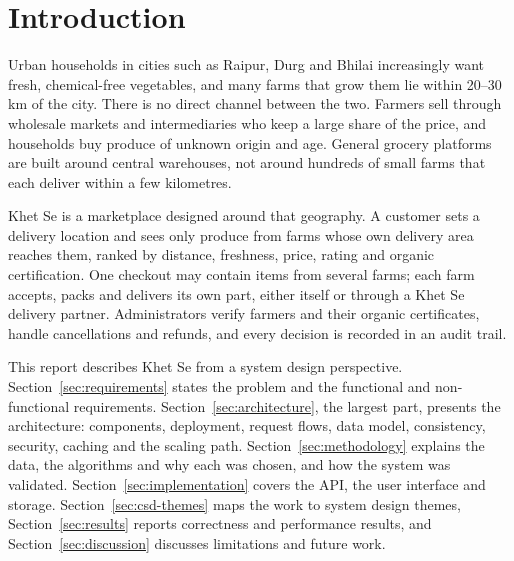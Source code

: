 \documentclass[manuscript,screen,review]{acmart}
\begin{document}

\maketitle

\section{Introduction}
\label{sec:intro}

Urban households in cities such as Raipur, Durg and Bhilai increasingly want fresh, chemical-free vegetables, and many farms that grow them lie within 20--30\,km of the city. There is no direct channel between the two. Farmers sell through wholesale markets and intermediaries who keep a large share of the price, and households buy produce of unknown origin and age. General grocery platforms are built around central warehouses, not around hundreds of small farms that each deliver within a few kilometres.

Khet Se is a marketplace designed around that geography. A customer sets a delivery location and sees only produce from farms whose own delivery area reaches them, ranked by distance, freshness, price, rating and organic certification. One checkout may contain items from several farms; each farm accepts, packs and delivers its own part, either itself or through a Khet Se delivery partner. Administrators verify farmers and their organic certificates, handle cancellations and refunds, and every decision is recorded in an audit trail.

This report describes Khet Se from a system design perspective. Section~\ref{sec:requirements} states the problem and the functional and non-functional requirements. Section~\ref{sec:architecture}, the largest part, presents the architecture: components, deployment, request flows, data model, consistency, security, caching and the scaling path. Section~\ref{sec:methodology} explains the data, the algorithms and why each was chosen, and how the system was validated. Section~\ref{sec:implementation} covers the API, the user interface and storage. Section~\ref{sec:csd-themes} maps the work to system design themes, Section~\ref{sec:results} reports correctness and performance results, and Section~\ref{sec:discussion} discusses limitations and future work.
\end{document}
